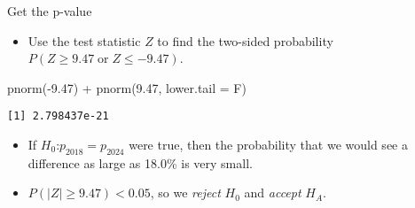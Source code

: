 \documentclass[
  ignorenonframetext,
]{beamer}
\newenvironment{Shaded}{\begin{snugshade}}{\end{snugshade}}
\newcommand{\AttributeTok}[1]{\textcolor[rgb]{0.40,0.45,0.13}{#1}}
\newcommand{\FloatTok}[1]{\textcolor[rgb]{0.68,0.00,0.00}{#1}}
\newcommand{\FunctionTok}[1]{\textcolor[rgb]{0.28,0.35,0.67}{#1}}
\newcommand{\NormalTok}[1]{\textcolor[rgb]{0.00,0.23,0.31}{#1}}
\newcommand{\SpecialCharTok}[1]{\textcolor[rgb]{0.37,0.37,0.37}{#1}}
\providecommand{\tightlist}{%
  \setlength{\itemsep}{0pt}\setlength{\parskip}{0pt}}\usepackage{longtable,booktabs,array}
\begin{document}
\begin{frame}[fragile]{Get the p-value}
\label{get-the-p-value-1}
\begin{itemize}
\tightlist
\item
  Use the test statistic \(Z\) to find the two-sided probability
  \(P(Z \ge 9.47 \operatorname{or} Z \le -9.47)\).
\end{itemize}

\begin{Shaded}
\begin{Highlighting}[]
\FunctionTok{pnorm}\NormalTok{(}\SpecialCharTok{{-}}\FloatTok{9.47}\NormalTok{) }\SpecialCharTok{+} \FunctionTok{pnorm}\NormalTok{(}\FloatTok{9.47}\NormalTok{, }\AttributeTok{lower.tail =}\NormalTok{ F)}
\end{Highlighting}
\end{Shaded}

\begin{verbatim}
[1] 2.798437e-21
\end{verbatim}

\pause

\begin{itemize}
\tightlist
\item
  If \(H_0\):\(p_{2018}=p_{2024}\) were true, then the probability that
  we would see a difference as large as 18.0\% is very small.
\end{itemize}

\pause

\begin{itemize}
\tightlist
\item
  \(P(\lvert Z \rvert \ge 9.47) < 0.05\), so we \emph{reject} \(H_0\)
  and \emph{accept} \(H_A\).
\end{itemize}
\end{frame}
\end{document}

